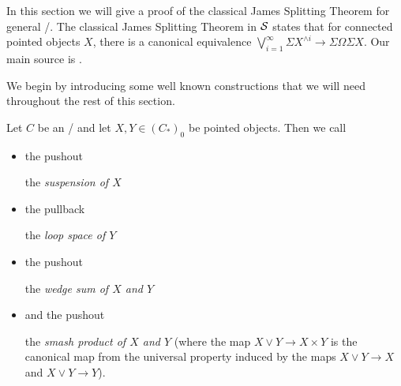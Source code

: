 In this section we will give a proof of the classical James Splitting Theorem \cite{james_splitting_original} for general \inftytops/.
The classical James Splitting Theorem in $\mathcal{S}$ states that for connected pointed objects $X$, there is a canonical equivalence $\bigvee\limits_{i=1}^{\infty}\Sigma X^{\wedge i}\to\Sigma\Omega\Sigma X$.
Our main source is \cite[\S 2.2 and \S 4]{splittings_21}.

We begin by introducing some well known constructions that we will need throughout the rest of this section.
\begin{definition}
    Let $C$ be an \inftytop/ and let $X,Y\in \left(C_*\right)_0$ be pointed objects. %
    Then we call 
    \begin{itemize}
        \item the pushout
        \begin{center}
        \end{center}
        the \emph{suspension of $X$}
        \item the pullback
        \begin{center}
        \end{center}
        the \emph{loop space of $Y$}
        \item the pushout
        \begin{center}
        \end{center}
        the \emph{wedge sum of $X$ and $Y$} 
        \item and the pushout 
        \begin{center}
        \end{center}
        the \emph{smash product of $X$ and $Y$} (where the map $X\vee Y\to X\times Y$ is the canonical map from the universal property induced by the maps $X\vee Y\to X$ and $X\vee Y\to Y$).
    \end{itemize}
\end{definition}
